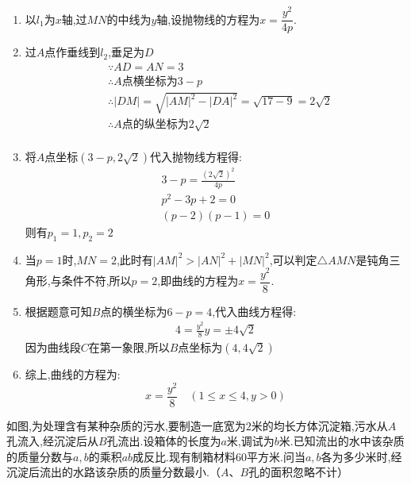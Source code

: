 \begin{questions}
	\begin{solution}
		\begin{enumerate}[label=\protect\circled{\arabic*}]
			\item 以$l_1$为$x$轴,过$MN$的中线为$y$轴,设抛物线的方程为$x=\dfrac{y^2}{4p}$.
			\item 过$A$点作垂线到$l_2$,垂足为$D$
			      \begin{align*}
				       & \because AD = AN = 3                                                  \\
				       & \therefore A \text{点横坐标为} 3-p                                         \\
				       & \therefore  |DM| = \sqrt{|AM|^2 - |DA|^2} = \sqrt{17 - 9} = 2\sqrt{2} \\
				       & \therefore A\text{点的纵坐标为}2\sqrt{2}                                    \\
			      \end{align*}
			\item 将$A$点坐标$(3-p, 2\sqrt{2})$代入抛物线方程得:
			      \begin{align*}
				      3-p = \frac{(2\sqrt{2})^2}{4p} \\
				      p^2 -3p + 2 = 0                \\
				      (p-2)(p-1) = 0
			      \end{align*}
			      则有$p_1 = 1, p_2 = 2$
			\item 当$p=1$时,$MN=2$,此时有$|AM|^2 > |AN|^2 +
				      |MN|^2$,可以判定$\triangle{AMN}$是钝角三角形,与条件不符,所以$p=2$,即曲线的方程为$x=\dfrac{y^2}{8}$.
			\item 根据题意可知$B$点的横坐标为$6-p=4$,代入曲线方程得:
			      \begin{align*}
				      4 = \frac{y^2}{8}
				      y = \pm4\sqrt{2}
			      \end{align*}
			      因为曲线段$C$在第一象限,所以$B$点坐标为$(4,4\sqrt{2})$

			\item 综上,曲线的方程为:
			      \begin{equation*}
				      x = \frac{y^2}{8} \quad (1 \leqslant x \leqslant 4, y>0)
			      \end{equation*}
		\end{enumerate}

	\end{solution}

	\question
	如图,为处理含有某种杂质的污水,要制造一底宽为$2$米的均长方体沉淀箱,污水从$A$孔流入,经沉淀后从$B$孔流出.设箱体的长度为$a$米,调试为$b$米.已知流出的水中该杂质的质量分数与$a,b$的乘积$ab$成反比.现有制箱材料$60$平方米.问当$a,b$各为多少米时,经沉淀后流出的水路该杂质的质量分数最小.（$A$、$B$孔的面积忽略不计）


\end{questions}
